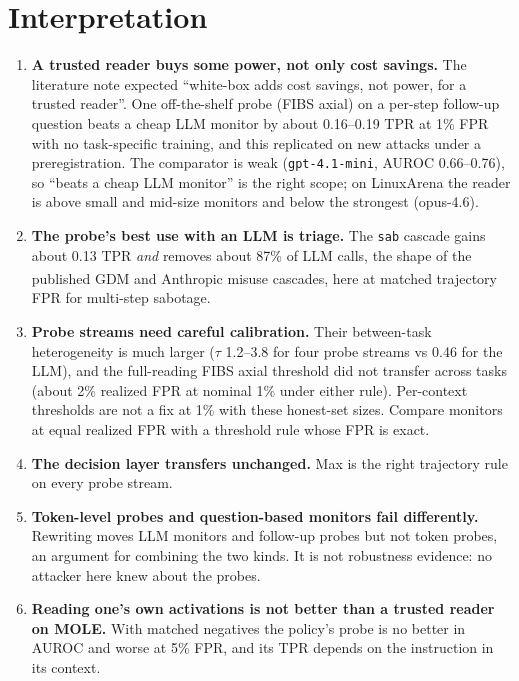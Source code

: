 \documentclass[11pt]{article}
\newcommand{\uv}{\textsuperscript{\dag}}
\begin{document}
\section{Interpretation}
\begin{enumerate}
\item \textbf{A trusted reader buys some power, not only cost savings.} The literature note expected ``white-box adds cost savings, not power, for a trusted reader''. One off-the-shelf probe (FIBS axial) on a per-step follow-up question beats a cheap LLM monitor by about 0.16--0.19 TPR at 1\% FPR with no task-specific training, and this replicated on new attacks under a preregistration. The comparator is weak (\texttt{gpt-4.1-mini}, AUROC 0.66--0.76), so ``beats a cheap LLM monitor'' is the right scope; on LinuxArena the reader is above small and mid-size monitors and below the strongest (opus-4.6).
\item \textbf{The probe's best use with an LLM is triage.} The \texttt{sab} cascade gains about 0.13 TPR \emph{and} removes about 87\% of LLM calls, the shape of the published GDM and Anthropic misuse cascades\uv, here at matched trajectory FPR for multi-step sabotage.
\item \textbf{Probe streams need careful calibration.} Their between-task heterogeneity is much larger ($\tau$ 1.2--3.8 for four probe streams vs 0.46 for the LLM), and the full-reading FIBS axial threshold did not transfer across tasks (about 2\% realized FPR at nominal 1\% under either rule). Per-context thresholds are not a fix at 1\% with these honest-set sizes. Compare monitors at equal realized FPR with a threshold rule whose FPR is exact.
\item \textbf{The decision layer transfers unchanged.} Max is the right trajectory rule on every probe stream.
\item \textbf{Token-level probes and question-based monitors fail differently.} Rewriting moves LLM monitors and follow-up probes but not token probes, an argument for combining the two kinds. It is not robustness evidence: no attacker here knew about the probes.
\item \textbf{Reading one's own activations is not better than a trusted reader on MOLE.} With matched negatives the policy's probe is no better in AUROC and worse at 5\% FPR, and its TPR depends on the instruction in its context.
\end{enumerate}
\end{document}
